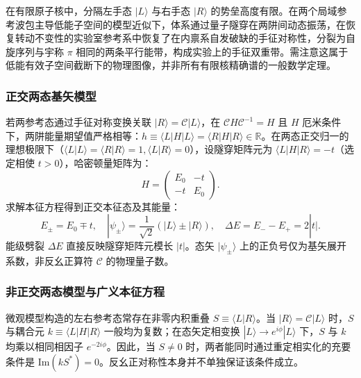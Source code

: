 在有限原子核中，分隔左手态 $|L\rangle$ 与右手态 $|R\rangle$ 的势垒高度有限。在两个局域参考波包主导低能子空间的模型近似下，体系通过量子隧穿在两阱间动态振荡，在恢复转动不变性的实验室参考系中恢复了在内禀系自发破缺的手征对称性，分裂为自旋序列与宇称 $\pi$ 相同的两条平行能带，构成实验上的手征双重带。需注意这属于低能有效子空间截断下的物理图像，并非所有有限核精确谱的一般数学定理。

\subsubsection{正交两态基矢模型}\label{sec:3-5-5-1}

若两参考态通过手征对称变换关联 $|R\rangle = \mathcal{C}|L\rangle$，在 $\mathcal{C}H\mathcal{C}^{-1} = H$ 且 $H$ 厄米条件下，两阱能量期望值严格相等：$h \equiv \langle L|H|L\rangle = \langle R|H|R\rangle \in \mathbb{R}$。在两态正交归一的理想极限下（$\langle L|L\rangle = \langle R|R\rangle = 1, \langle L|R\rangle = 0$），设隧穿矩阵元为 $\langle L|H|R\rangle = -t$（选定相使 $t > 0$），哈密顿量矩阵为：
\begin{equation}\label{eq:3-5-orth-two-state-H}
H = \begin{pmatrix} E_0 & -t \\ -t & E_0 \end{pmatrix}.
\end{equation}
求解本征方程得到正交本征态及其能量：
\begin{equation}\label{eq:3-5-orth-two-state-sol}
E_\pm = E_0 \mp t, \quad |\psi_\pm\rangle = \frac{1}{\sqrt{2}}(|L\rangle \pm |R\rangle), \quad \Delta E = E_- - E_+ = 2|t|.
\end{equation}
能级劈裂 $\Delta E$ 直接反映隧穿矩阵元模长 $|t|$。态矢 $|\psi_\pm\rangle$ 上的正负号仅为基矢展开系数，非反幺正算符 $\mathcal{C}$ 的物理量子数。

\subsubsection{非正交两态模型与广义本征方程}\label{sec:3-5-5-2}

微观模型构造的左右参考态常存在非零内积重叠 $S \equiv \langle L|R\rangle$。当 $|R\rangle = \mathcal{C}|L\rangle$ 时，$S$ 与耦合元 $k \equiv \langle L|H|R\rangle$ 一般均为复数；在态矢定相变换 $|L\rangle \to e^{i\phi}|L\rangle$ 下，$S$ 与 $k$ 均乘以相同相因子 $e^{-2i\phi}$。因此，当 $S \ne 0$ 时，两者能同时通过重定相实化的充要条件是 $\text{Im}(kS^*) = 0$。反幺正对称性本身并不单独保证该条件成立。

